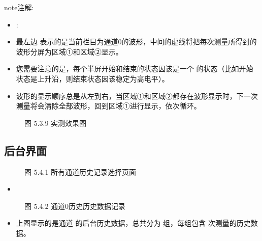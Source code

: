 \documentclass[a4paper,10pt,english]{sphinxmanual}
\begin{document}
\begin{sphinxadmonition}{note}{注解:}\begin{itemize}
\item {} 
\sphinxAtStartPar
{} :

\item {} 
\sphinxAtStartPar
最左边  表示的是当前栏目为通道0的波形，中间的虚线将把每次测量所得到的波形分屏为区域①和区域②显示。

\item {} 
\sphinxAtStartPar
您需要注意的是，每个半屏开始和结束的状态因该是一个  的状态（比如开始状态是上升沿，则结束状态因该稳定为高电平）。

\item {} 
\sphinxAtStartPar
波形的显示顺序总是从左到右，当区域①和区域②都存在波形显示时，下一次测量将会清除全部波形，回到区域①进行显示，依次循环。

\end{itemize}
\end{sphinxadmonition}

\begin{figure}[htbp]
\centering
\capstart

\noindent{}
\caption{图 5.3.9 实测效果图}\label{\detokenize{operation_guide:id17}}\end{figure}


\subsection{后台界面}
\label{\detokenize{operation_guide:id5}}
\begin{figure}[htbp]
\centering
\capstart

\noindent{}
\caption{图 5.4.1 所有通道历史记录选择页面}\label{\detokenize{operation_guide:id18}}\end{figure}
\begin{itemize}
\item {} 
\sphinxAtStartPar
{}

\end{itemize}

\begin{figure}[htbp]
\centering
\capstart

\noindent{}
\caption{图 5.4.2 通道0历史历史数据记录}\label{\detokenize{operation_guide:id19}}\end{figure}
\begin{itemize}
\item {} 
\sphinxAtStartPar
上图显示的是通道  的后台历史数据，总共分为  组，每组包含  次测量的历史数据。

\end{itemize}
\end{document}

